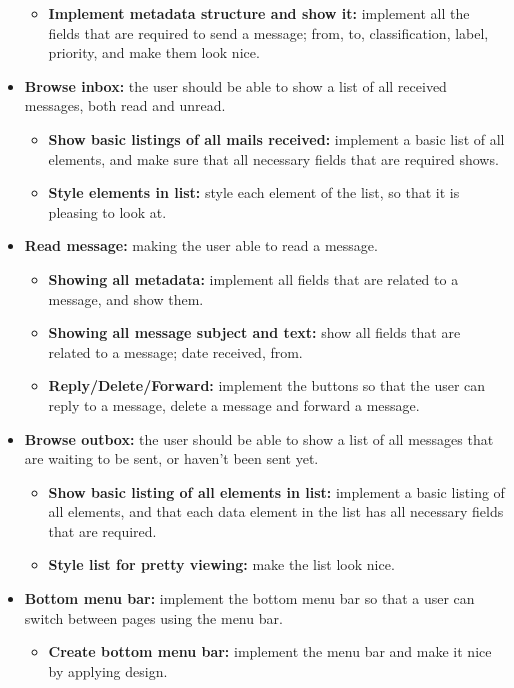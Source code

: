 \begin{itemize}
\begin{itemize}
\item{}\textbf{Implement metadata structure and show it:} implement all the fields that are required to send a message; from, to, classification, label, priority, and make them look nice.
\end{itemize}
\item{}\textbf{Browse inbox:} the user should be able to show a list of all received messages, both read and unread.
\begin{itemize}
\item{}\textbf{Show basic listings of all mails received:} implement a basic list of all elements, and make sure that all necessary fields that are required shows.
\item{}\textbf{Style elements in list:} style each element of the list, so that it is pleasing to look at.
\end{itemize}
\item{}\textbf{Read message:} making the user able to read a message.
\begin{itemize}
\item{}\textbf{Showing all metadata:} implement all fields that are related to a message, and show them.
\item{}\textbf{Showing all message subject and text:} show all fields that are related to a message; date received, from. 
\item{}\textbf{Reply/Delete/Forward:} implement the buttons so that the user can reply to a message, delete a message and forward a message.
\end{itemize}
\item{}\textbf{Browse outbox:} the user should be able to show a list of all messages that are waiting to be sent, or haven’t been sent yet.
\begin{itemize}
\item{}\textbf{Show basic listing of all elements in list:} implement a basic listing of all elements, and that each data element in the list has all necessary fields that are required.
\item{}\textbf{Style list for pretty viewing:} make the list look nice.
\end{itemize}
\item{}\textbf{Bottom menu bar:} implement the bottom menu bar so that a user can switch between pages using the menu bar.
\begin{itemize}
\item{}\textbf{Create bottom menu bar:} implement the menu bar and make it nice by applying design.

\end{itemize}
\end{itemize}
